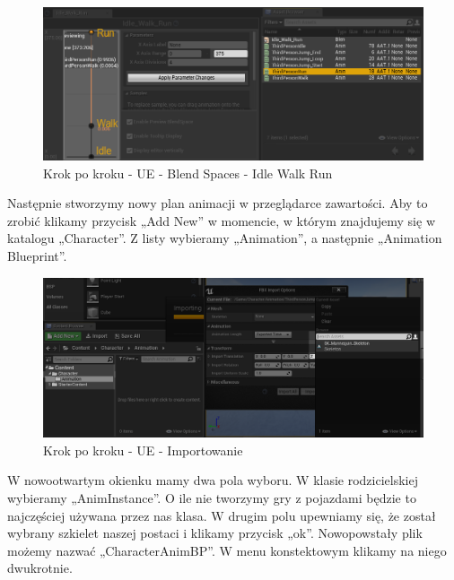 \documentclass[12pt]{xmgr}
\begin{document}
\begin{figure}[!htb]
    \begin{center}
    \includegraphics[scale=0.5]{Screeny/UeKrokPoKroku/UE-BlendSpace-IdleWalkRun.png}
    \end{center}
    \caption{Krok po kroku - UE - Blend Spaces - Idle Walk Run}
\end{figure}

Następnie stworzymy nowy plan animacji w przeglądarce zawartości. Aby to zrobić klikamy przycisk „Add New” w momencie, w którym znajdujemy się w katalogu „Character”. Z listy wybieramy „Animation”, a następnie „Animation Blueprint”.

\begin{figure}[!htb]
    \begin{center}
    \includegraphics[scale=0.35]{Screeny/UeKrokPoKroku/UE-Import.png}
    \end{center}
    \caption{Krok po kroku - UE - Importowanie}
\end{figure}

\newpage
W nowootwartym okienku mamy dwa pola wyboru. W klasie rodzicielskiej wybieramy „AnimInstance”. O ile nie tworzymy gry z pojazdami będzie to najczęściej używana przez nas klasa. W drugim polu upewniamy się, że został wybrany szkielet naszej postaci i klikamy przycisk „ok”. Nowopowstały plik możemy nazwać „CharacterAnimBP”. W menu konstektowym klikamy na niego dwukrotnie.
\end{document}
